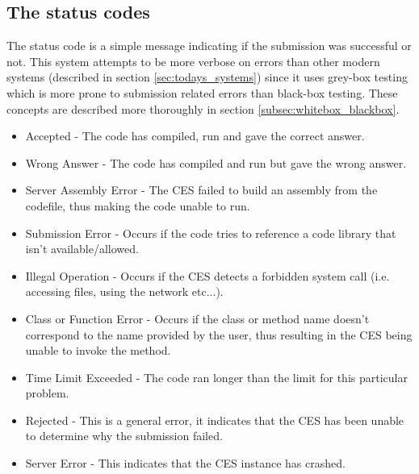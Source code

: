 \subsection{The status codes} \label{subsec:status_codes}
The status code is a simple message indicating if the submission was successful or not. This system attempts to be more verbose on errors than other modern systems (described in section \ref{sec:todays_systems}) since it uses grey-box testing which is more prone to submission related errors than black-box testing. These concepts are described more thoroughly in section \ref{subsec:whitebox_blackbox}.
\begin{itemize}
	\item Accepted - The code has compiled, run and gave the correct answer.
	\item Wrong Answer - The code has compiled and run but gave the wrong answer.
	\item Server Assembly Error - The CES failed to build an assembly from the codefile, thus making the code unable to run.
	\item Submission Error - Occurs if the code tries to reference a code library that isn't available/allowed. 
	\item Illegal Operation - Occurs if the CES detects a forbidden system call (i.e. accessing files, using the network etc...).
	\item Class or Function Error - Occurs if the class or method name doesn't correspond to the name provided by the user, thus resulting in the CES being unable to invoke the method.
	\item Time Limit Exceeded - The code ran longer than the limit for this particular problem.
	\item Rejected - This is a general error, it indicates that the CES has been unable to determine why the submission failed. 
	\item Server Error - This indicates that the CES instance has crashed.
\end{itemize}

